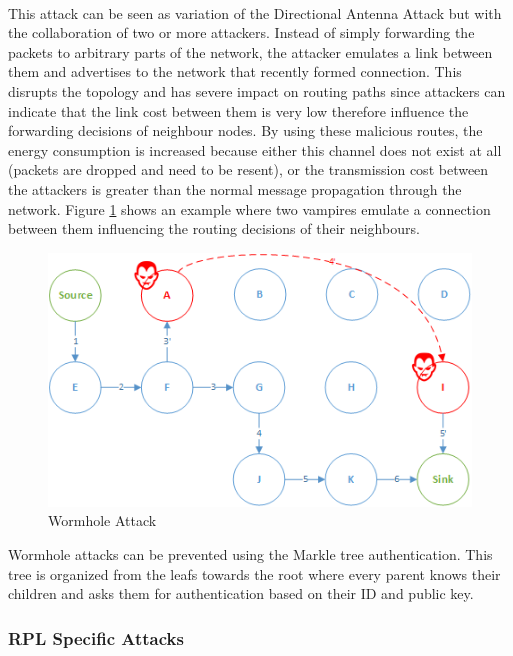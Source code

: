 \paragraph{}
This attack can be seen as variation of the Directional Antenna Attack but with the collaboration of two or more attackers. Instead of simply forwarding the packets to arbitrary parts of the network, the attacker emulates a link between them and advertises to the network that recently formed connection. This disrupts the topology and has severe impact on routing paths since attackers can indicate that the link cost between them is very low therefore influence the forwarding decisions of neighbour nodes. By using these malicious routes, the energy consumption is increased because either this channel does not exist at all (packets are dropped and need to be resent), or the transmission cost between the attackers is greater than the normal message propagation through the network. Figure \ref{fig:wormhole_attack} shows an example where two vampires emulate a connection between them influencing the routing decisions of their neighbours.

\begin{figure}[h]
  \centering
  \includegraphics[width=0.8\linewidth]{figures/Wormhole_attack.png}
  \caption{Wormhole Attack}
  \label{fig:wormhole_attack}
\end{figure} 

Wormhole attacks can be prevented using the Markle tree authentication. This tree is organized from the leafs towards the root where every parent knows their children and asks them for authentication based on their ID and public key.

\subsubsection{RPL Specific Attacks}
\paragraph{} 



